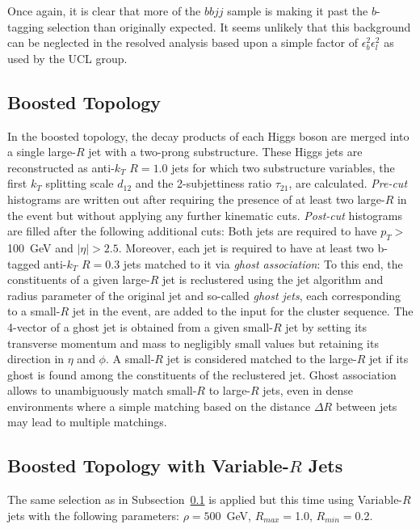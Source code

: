 \documentclass[12pt]{article}
\begin{document}
Once again, it is clear that more of the $bbjj$ sample is making it past the $b$-tagging selection than originally expected. It seems unlikely that this background can be neglected in the resolved analysis based upon a simple factor of $\epsilon_b^{2}\epsilon_l^{2}$ as used by the UCL group.

\subsection{Boosted Topology}\label{sec:Boosted_FR}

In the boosted topology, the decay products of each Higgs boson are merged into a single large-$R$ jet with a two-prong substructure. 
These Higgs jets are reconstructed as anti-$k_T$ $R=1.0$ jets for which two substructure variables, the first $k_T$ splitting scale $d_{12}$
and the 2-subjettiness ratio $\tau_{21}$, are calculated.
\textit{Pre-cut} histograms are written out after requiring the presence of at least two large-$R$ in the event but without applying any further
kinematic cuts. \textit{Post-cut} histograms are filled after the following additional cuts: 
Both jets are required to have $p_T >$100~GeV and $|\eta|>2.5$. Moreover, each jet is required to have at least two b-tagged anti-$k_T$ $R=0.3$ 
jets matched to it via \textit{ghost association}: 
To this end, the constituents of a given large-$R$ jet is reclustered using the jet algorithm 
and radius parameter of the original jet and so-called \textit{ghost jets}, each corresponding to a small-$R$ jet in the event, 
are added to the input for the cluster sequence. The 4-vector of a ghost jet is obtained from a given small-$R$ jet 
by setting its transverse momentum and mass to negligibly small values but retaining its direction in $\eta$ and $\phi$. A small-$R$ jet is 
considered matched to the large-$R$ jet if its ghost is found among the constituents of the reclustered jet. Ghost association allows to unambiguously
match small-$R$ to large-$R$ jets, even in dense environments where a simple matching based on the distance $\Delta R$ between jets 
may lead to multiple matchings.

\subsection{Boosted Topology with Variable-$R$ Jets}

The same selection as in Subsection~\ref{sec:Boosted_FR} is applied but this time using Variable-$R$ jets with the following parameters:
$\rho=500$~GeV, $R_{max}=$1.0, $R_{min}=$0.2.
\end{document}
